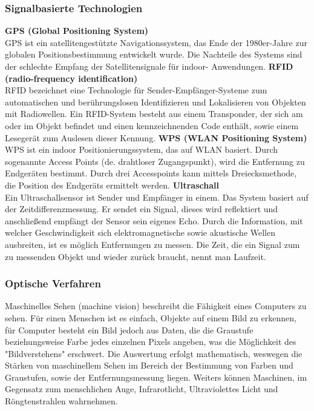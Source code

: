     \subsubsection{Signalbasierte Technologien}
    \textbf{GPS (Global Positioning System)}\\
    GPS ist ein satellitengestützte Navigationssystem, das Ende der 1980er-Jahre zur globalen Positionsbestimmung entwickelt wurde. Die Nachteile des Systems sind der schlechte Empfang der Satellitensignale für indoor- Anwendungen. 
    \textbf{RFID (radio-frequency identification)}\\
    RFID bezeichnet eine Technologie für Sender-Empfänger-Systeme zum automatischen und berührungslosen Identifizieren und Lokalisieren von Objekten mit Radiowellen. Ein RFID-System besteht aus einem Transponder, der sich am oder im Objekt befindet und einen kennzeichnenden Code enthält, sowie einem Lesegerät zum Auslesen dieser Kennung. 
    \textbf{WPS (WLAN Positioning System)}\\    
    WPS ist ein indoor Positionierungssystem, das auf WLAN basiert. Durch sogenannte  Access Points (de. drahtloser Zugangspunkt), wird die Entfernung zu Endgeräten bestimmt. Durch drei Accesspoints kann mittels Dreiecksmethode, die Position des Endgeräts ermittelt werden.
    \textbf{Ultraschall}\\
    Ein Ultraschallsensor ist Sender und Empfänger in einem. Das System basiert auf der Zeitdifferenzmessung. Er sendet ein Signal, dieses wird reflektiert und anschließend empfängt der Sensor sein eigenes Echo.
    Durch die Information, mit welcher Geschwindigkeit sich elektromagnetische sowie akustische Wellen ausbreiten, ist es möglich Entfernungen zu messen. Die Zeit, die ein Signal zum zu messenden Objekt und wieder zurück braucht, nennt man Laufzeit.

    \subsubsection{Optische Verfahren}
    Maschinelles Sehen (machine vision) beschreibt die Fähigkeit eines Computers zu sehen. 
    Für einen Menschen ist es einfach, Objekte auf einem Bild zu erkennen, für Computer besteht ein Bild jedoch aus Daten, die die Graustufe beziehungsweise Farbe jedes einzelnen Pixels angeben, was die Möglichkeit des "Bildverstehens" erschwert.
    Die Auswertung erfolgt mathematisch, weswegen die Stärken von maschinellem Sehen im Bereich der Bestimmung von Farben und Graustufen, sowie der Entfernungsmessung liegen. Weiters können Maschinen, im Gegensatz zum menschlichen Auge, Infrarotlicht, Ultraviolettes Licht und Röngtenstrahlen wahrnehmen. \cite{machinevision} \cite{machinevision2}

